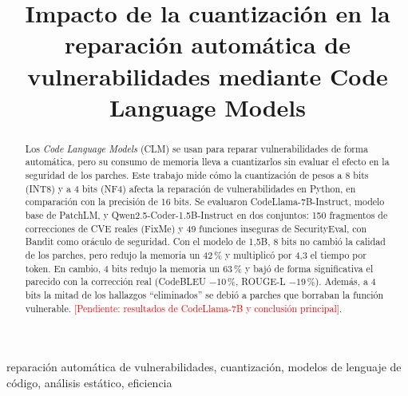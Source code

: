 \documentclass[conference]{IEEEtran}
\newcommand{\pend}[1]{\textcolor{red}{[Pendiente: #1]}}
\begin{document}
\title{ Impacto de la cuantización en la reparación automática de vulnerabilidades mediante Code Language Models}

\author{
\and
{}

}

\maketitle

\begin{abstract}
Los \emph{Code Language Models} (CLM) se usan para reparar vulnerabilidades de forma automática, pero su consumo de memoria lleva a cuantizarlos sin evaluar el efecto en la seguridad de los parches. Este trabajo mide cómo la cuantización de pesos a 8 bits (INT8) y a 4 bits (NF4) afecta la reparación de vulnerabilidades en Python, en comparación con la precisión de 16 bits. Se evaluaron CodeLlama-7B-Instruct, modelo base de PatchLM, y Qwen2.5-Coder-1.5B-Instruct en dos conjuntos: 150 fragmentos de correcciones de CVE reales (FixMe) y 49 funciones inseguras de SecurityEval, con Bandit como oráculo de seguridad. Con el modelo de 1,5B, 8 bits no cambió la calidad de los parches, pero redujo la memoria un 42\,\% y multiplicó por 4,3 el tiempo por token. En cambio, 4 bits redujo la memoria un 63\,\% y bajó de forma significativa el parecido con la corrección real (CodeBLEU $-10$\,\%, ROUGE-L $-19$\,\%). Además, a 4 bits la mitad de los hallazgos ``eliminados'' se debió a parches que borraban la función vulnerable. \pend{resultados de CodeLlama-7B y conclusión principal}.
\end{abstract}

\begin{IEEEkeywords}
reparación automática de vulnerabilidades, cuantización, modelos de lenguaje de código, análisis estático, eficiencia
\end{IEEEkeywords}
\end{document}
